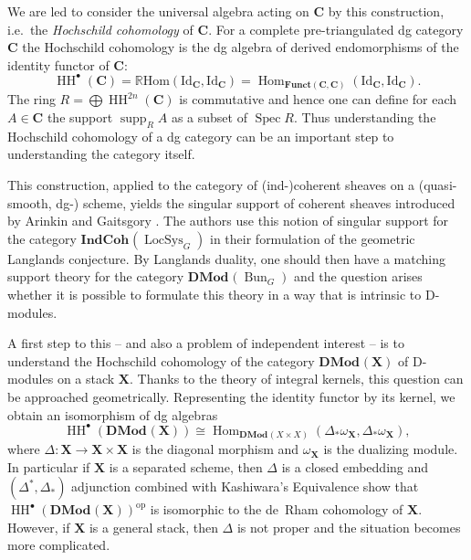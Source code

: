 \documentclass{oupau}
\theoremstyle{remark}
\DeclareMathOperator\Spec{Spec}
\let\stack\mathbf                           %
\newcommand\LocSys{\operatorname{LocSys}}   %
\newcommand\Bun{\operatorname{Bun}}         %
\newcommand\cat{\mathbf}                    %
\DeclareMathOperator\Hom{Hom}
\newcommand\id[1][]{{\mathrm{Id}_{#1}}}     %
\newcommand\cx\bullet                       %
\newcommand{\HCoh}{\operatorname{HH}^\cx}   %
\DeclareMathOperator\supp{supp}     %
\newcommand\catDMod[2][]{\cat{DMod}_{#1}(#2)}   %
\newcommand\catIndCoh[2][]{\cat{IndCoh}_{#1}(#2)} %
\newcommand\opalg[1]{#1^{\mathrm{op}}}
\begin{document}
We are led to consider the universal algebra acting on $\cat C$ by this construction, i.e.~the \emph{Hochschild cohomology} of $\cat C$.
For a complete pre-triangulated dg category $\cat C$ the Hochschild cohomology is the dg algebra of derived endomorphisms of the identity functor of $\cat C$:
\[
    \HCoh(\cat C)
    = \mathbb{R}\mathrm{Hom}(\id[\cat C], \id[\cat C])
    = \Hom_{\cat{Funct}(\cat C, \cat C)}(\id[\cat C], \id[\cat C]).
\]
The ring $R = \bigoplus \operatorname{HH}^{2n}(\cat C)$ is commutative and hence one can define for each $A ∈ \cat C$ the support $\supp_R A$ as a subset of $\Spec R$.
Thus understanding the Hochschild cohomology of a dg category can be an important step to understanding the category itself.

This construction, applied to the category of (ind-)coherent sheaves on a (quasi-smooth, dg-) scheme, yields the singular support of coherent sheaves introduced by Arinkin and Gaitsgory \cite{ArinkinGaitsgory:2015:SingularSupport}.
The authors use this notion of singular support for the category $\catIndCoh{\LocSys_G}$ in their formulation of the geometric Langlands conjecture.
By Langlands duality, one should then have a matching support theory for the category $\catDMod{\Bun_G}$ and the question arises whether it is possible to formulate this theory in a way that is intrinsic to D-modules.

A first step to this -- and also a problem of independent interest -- is to understand the Hochschild cohomology of the category $\catDMod{\stack X}$ of D-modules on a stack $\stack X$.
Thanks to the theory of integral kernels, this question can be approached geometrically.
Representing the identity functor by its kernel, we obtain an isomorphism of dg algebras
\begin{equation}
    \label{eq:intro:d-mod-hcoh}
    \HCoh(\catDMod{\stack X}) \cong \Hom_{\catDMod{X×X}}(Δ_*ω_{\stack X}, Δ_*ω_{\stack X}),
\end{equation}
where $Δ\colon \stack X \to \stack X \times \stack X$ is the diagonal morphism and $ω_{\stack X}$ is the dualizing module.
In particular if $\stack X$ is a separated scheme, then $Δ$ is a closed embedding and $(Δ^*,Δ_*)$ adjunction combined with Kashiwara's Equivalence show that $\opalg{\HCoh(\catDMod{\stack X})}$ is isomorphic to the de~Rham cohomology of $\stack X$.
However, if $\stack X$ is a general stack, then $Δ$ is not proper and the situation becomes more complicated.
\end{document}
